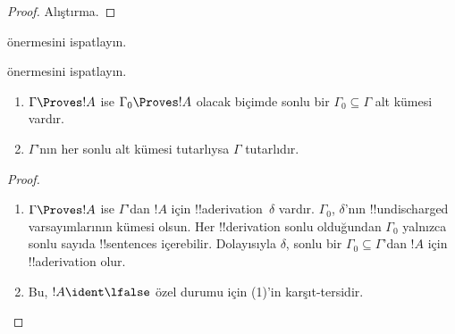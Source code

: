 \documentclass[../../../include/open-logic-section]{subfiles}
\begin{document}
\begin{proof}
Alıştırma.
\end{proof}

\begin{prob}
 önermesini ispatlayın.
\end{prob}
\tagendprob

\begin{prob}
 önermesini ispatlayın.
\end{prob}
\tagendprob

\begin{prop}[Kompaktlık]
  \begin{enumerate}
  \item $\Gamma \Proves !A$ ise $\Gamma_0 \Proves !A$ olacak biçimde sonlu
    bir $\Gamma_0 \subseteq \Gamma$ alt kümesi vardır.
  \item $\Gamma$'nın her sonlu alt kümesi tutarlıysa $\Gamma$ tutarlıdır.
  \end{enumerate}
\end{prop}

\begin{proof}
  \begin{enumerate}
    \item $\Gamma \Proves !A$ ise $\Gamma$'dan $!A$ için
      !!a{derivation}~$\delta$ vardır. $\Gamma_0$, $\delta$'nın
      !!{undischarged} varsayımlarının kümesi olsun. Her !!{derivation} sonlu
      olduğundan $\Gamma_0$ yalnızca sonlu sayıda !!{sentence}s içerebilir.
      Dolayısıyla $\delta$, sonlu bir $\Gamma_0 \subseteq \Gamma$'dan
      $!A$ için !!a{derivation} olur.
    \item Bu, $!A \ident \lfalse$ özel durumu için (1)'in karşıt-tersidir.
  \end{enumerate}
\end{proof}
\end{document}
